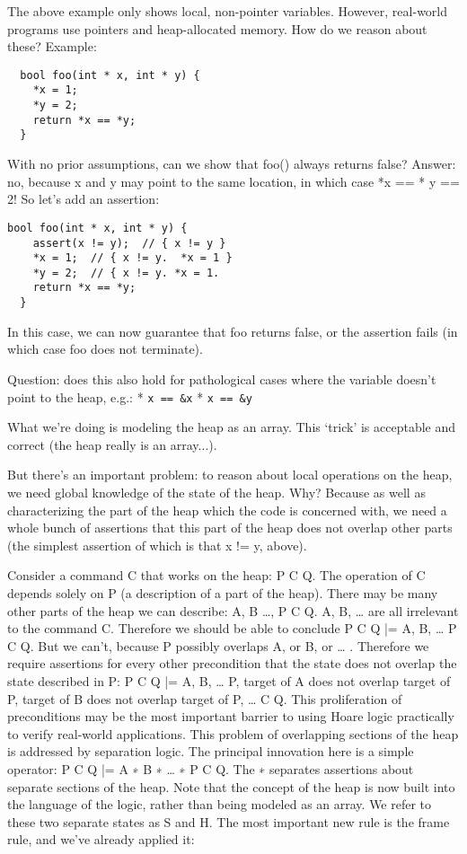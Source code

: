 The above example only shows local, non-pointer variables.
However, real-world programs use pointers and heap-allocated memory.
How do we reason about these?
Example:

\begin{lstlisting}
  bool foo(int * x, int * y) {
    *x = 1;
    *y = 2;
    return *x == *y;
  }
\end{lstlisting}

With no prior assumptions,
  can we show that foo() always returns false?
Answer: no, because x and y may point to the same location,
in which case *x == * y == 2!
So let's add an assertion:

\begin{lstlisting}
bool foo(int * x, int * y) {
    assert(x != y);  // { x != y }
    *x = 1;  // { x != y.  *x = 1 }
    *y = 2;  // { x != y. *x = 1.
    return *x == *y;
  }
\end{lstlisting}

In this case, we can now guarantee that foo returns false, or the assertion fails (in which case foo does not terminate).

Question: does this also hold for pathological cases where the variable doesn't point to the heap, e.g.:
* \lstinline|x == &x|
* \lstinline|x == &y|

What we’re doing is modeling the heap as an array.  This ‘trick’ is acceptable and correct (the heap really is an array...).

But there’s an important problem: to reason about local operations on the heap, we need global knowledge of the state of the heap.  Why?  Because as well as characterizing the part of the heap which the code is concerned with, we need a whole bunch of assertions that this part of the heap does not overlap other parts (the simplest assertion of which is that x != y, above).

Consider a command C that works on the heap:
  {P} C {Q}.
The operation of C depends solely on P (a description of a part of the heap).  There may be many other parts of the heap we can describe:
  {A, B …, P} C {Q}.
A, B, … are all irrelevant to the command C.  Therefore we should be able to conclude
  {P} C {Q} |= {A, B, … P} C {Q}.
But we can’t, because P possibly overlaps A, or B, or … .  Therefore we require assertions for every other precondition that the state does not overlap the state described in P:
  {P} C {Q} |= {A, B, … P, target of A does not overlap target of P, target of B does not overlap target of P, … } C {Q}.
This proliferation of preconditions may be the most important barrier to using Hoare logic practically to verify real-world applications.
This problem of overlapping sections of the heap is addressed by separation logic.  The principal innovation here is a simple operator:
  {P} C {Q} |= {A ∗ B ∗ … ∗ P} C {Q}.
The ∗ separates assertions about separate sections of the heap.  Note that the concept of the heap is now built into the language of the logic, rather than being modeled as an array.  We refer to these two separate states as S and H.
The most important new rule is the frame rule, and we’ve already applied it:

